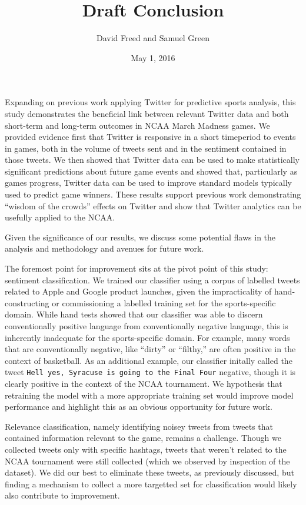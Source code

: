 \documentclass[12pt]{article}
\begin{document}
\setcounter{page}{1}
\begin{doublespacing}

\title{Draft Conclusion}
\author{David Freed and Samuel Green}
\date{May 1, 2016}
\maketitle

Expanding on previous work applying Twitter for predictive sports 
analysis, this study demonstrates the beneficial link between
relevant Twitter data and both short-term and long-term outcomes 
in NCAA March Madness games. We provided evidence first that 
Twitter is responsive in a short timeperiod to events in games,
both in the volume of tweets sent and in the sentiment contained
in those tweets. We then showed that Twitter data can be used
to make statistically significant predictions about future
game events and showed that, particularly as games progress,
Twitter data can be used to improve standard
models typically used to predict game winners.
These results support previous work demonstrating ``wisdom of the 
crowds'' effects on Twitter and show that Twitter analytics
can be usefully applied to the NCAA. 

Given the significance of our results, we discuss some potential
flaws in the analysis and methodology and avenues for future work.

The foremost point for improvement sits at the pivot point of this
study: sentiment classification. We trained our classifier 
using a corpus of labelled tweets related to Apple and Google
product launches, given the impracticality of hand-constructing
or commissioning a labelled training set for the sports-specific
domain. While hand tests showed that our classifier was 
able to discern conventionally positive language from 
conventionally negative language, this is inherently inadequate
for the sports-specific domain. For example, many words that
are conventionally negative, like ``dirty'' or ``filthy,'' are
often positive in the context of basketball. As an additional
example, our classifier initally called the tweet
\texttt{Hell yes, Syracuse is going to the Final Four}
negative, though it is clearly positive in the context of the 
NCAA tournament. We hypothesis that retraining the model with a 
more appropriate training set would improve model 
performance and highlight this as an obvious opportunity for
future work.

Relevance classification, namely identifying noisey tweets from
tweets that contained information relevant to the game,
remains a challenge. Though we collected tweets only with
specific hashtags, tweets that weren't related to the NCAA
tournament were still collected (which we observed by inspection
of the dataset). We did our best to eliminate these tweets, as 
previously discussed, but finding a mechanism to collect a more
targetted set for classification would likely also contribute
to improvement.


\end{doublespacing}
\end{document}
